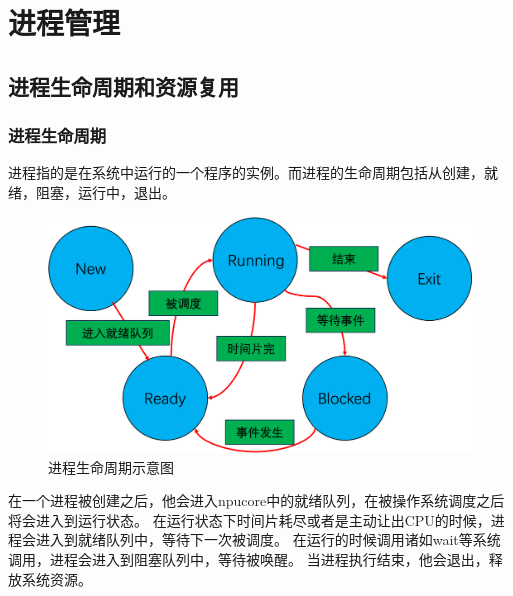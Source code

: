 \chapter{进程管理}
\section{进程生命周期和资源复用}
\subsection{进程生命周期}
进程指的是在系统中运行的一个程序的实例。而进程的生命周期包括从创建，就绪，阻塞，运行中，退出。
\begin{figure}[htb]
    \centering
    \includegraphics[width=\textwidth]{figures/05-01-进程生命周期示意图.png}
    \caption{
        进程生命周期示意图
    }
    \label{fig:user virtual process}
\end{figure}
在一个进程被创建之后，他会进入npucore中的就绪队列，在被操作系统调度之后将会进入到运行状态。
在运行状态下时间片耗尽或者是主动让出CPU的时候，进程会进入到就绪队列中，等待下一次被调度。
在运行的时候调用诸如wait等系统调用，进程会进入到阻塞队列中，等待被唤醒。
当进程执行结束，他会退出，释放系统资源。

